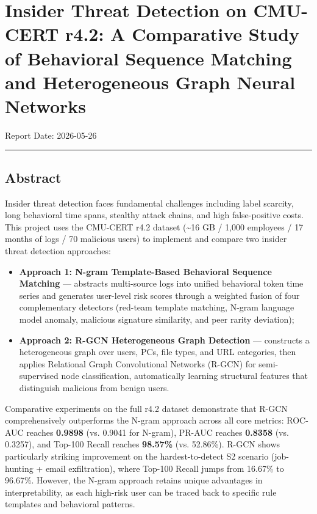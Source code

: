 \documentclass[
  a4paper,
  11pt]{article}
\author{}
\date{}
\providecommand{\tightlist}{%
  \setlength{\itemsep}{0pt}\setlength{\parskip}{0pt}}
\begin{document}
{
\setcounter{tocdepth}{3}
\tableofcontents
}
\section{Insider Threat Detection on CMU-CERT r4.2: A Comparative Study
of Behavioral Sequence Matching and Heterogeneous Graph Neural
Networks}\label{insider-threat-detection-on-cmu-cert-r42-a-comparative-study-of-behavioral-sequence-matching-and-heterogeneous-graph-neural-networks}

Report Date: 2026-05-26

\begin{center}\rule{0.5\linewidth}{0.5pt}\end{center}

\subsection{Abstract}\label{abstract}

Insider threat detection faces fundamental challenges including label
scarcity, long behavioral time spans, stealthy attack chains, and high
false-positive costs. This project uses the CMU-CERT r4.2 dataset
(\textasciitilde16 GB / 1,000 employees / 17 months of logs / 70
malicious users) to implement and compare two insider threat detection
approaches:

\begin{itemize}
\tightlist
\item
  \textbf{Approach 1: N-gram Template-Based Behavioral Sequence
  Matching} --- abstracts multi-source logs into unified behavioral
  token time series and generates user-level risk scores through a
  weighted fusion of four complementary detectors (red-team template
  matching, N-gram language model anomaly, malicious signature
  similarity, and peer rarity deviation);
\item
  \textbf{Approach 2: R-GCN Heterogeneous Graph Detection} ---
  constructs a heterogeneous graph over users, PCs, file types, and URL
  categories, then applies Relational Graph Convolutional Networks
  (R-GCN) for semi-supervised node classification, automatically
  learning structural features that distinguish malicious from benign
  users.
\end{itemize}

Comparative experiments on the full r4.2 dataset demonstrate that R-GCN
comprehensively outperforms the N-gram approach across all core metrics:
ROC-AUC reaches \textbf{0.9898} (vs. 0.9041 for N-gram), PR-AUC reaches
\textbf{0.8358} (vs. 0.3257), and Top-100 Recall reaches
\textbf{98.57\%} (vs. 52.86\%). R-GCN shows particularly striking
improvement on the hardest-to-detect S2 scenario (job-hunting + email
exfiltration), where Top-100 Recall jumps from 16.67\% to 96.67\%.
However, the N-gram approach retains unique advantages in
interpretability, as each high-risk user can be traced back to specific
rule templates and behavioral patterns.
\end{document}
